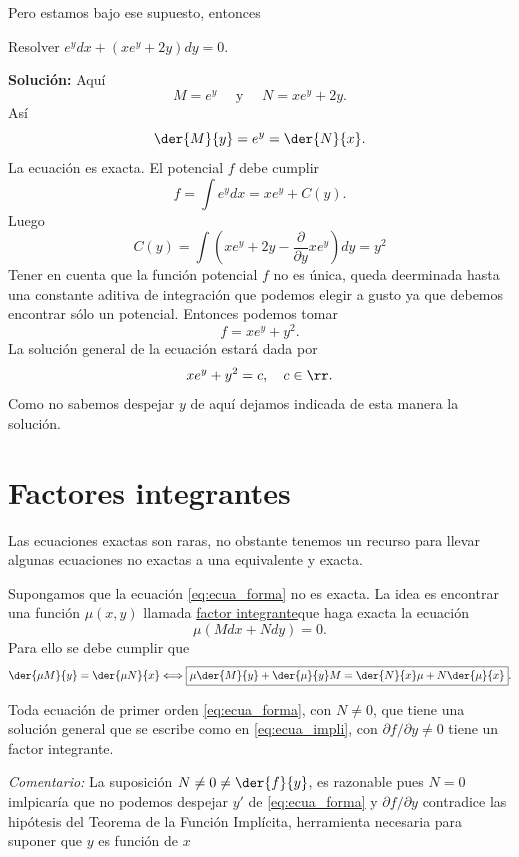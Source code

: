  Pero estamos bajo ese supuesto, entonces

\begin{ejemplo} Resolver $e^ydx+(xe^y+2y)dy=0$.
 \end{ejemplo}


\noindent\textbf{Solución:} Aquí
\[M=e^y\quad\text{ y }\quad N=xe^y+2y.\]
Así
\[\der{M}{y}=e^y=\der{N}{x}.\]
La ecuación es exacta. El potencial $f$ debe cumplir
\[f=\int e^ydx=xe^y+C(y).\]
Luego
\[C(y)=\int\left( xe^y+2y -\frac{\partial}{\partial y} xe^y\right)dy= y^2\]
Tener en cuenta que la función potencial $f$ no es única, queda deerminada hasta una constante aditiva de integración que podemos elegir a gusto ya que
debemos encontrar sólo un potencial. Entonces podemos tomar
\[f= xe^y+y^2.\]
La solución general de la ecuación estará dada por
\[xe^y+y^2=c,\quad c\in\rr.\]
Como no sabemos despejar $\boxed{y}$ de aquí dejamos indicada de esta manera la solución.



\section{Factores integrantes}

 Las ecuaciones exactas son raras, no obstante tenemos un recurso para llevar algunas ecuaciones no exactas a una equivalente y exacta.

 Supongamos que la ecuación  \eqref{eq:ecua_forma} no es  exacta. La idea es encontrar una función $\mu(x,y)$ llamada
\href{http://es.wikipedia.org/wiki/Ecuación_diferencial_exacta\#Factor_integrante.}{factor integrante}\link que haga exacta la ecuación
\[\mu\left(Mdx+Ndy\right)=0.\]
 Para ello se debe cumplir que
\begin{equation}\label{carac_factor}
  \der{\mu M}{y}=\der{\mu N}{x}\Longleftrightarrow \boxed{ \mu\der{M}{y}+\der{\mu}{y}M=\der{N}{x}\mu+N\der{\mu}{x}}.
\end{equation}

\begin{proposicion} Toda ecuación de primer
 orden \eqref{eq:ecua_forma}, con $N\neq 0$,  que tiene una solución general
que se escribe como en \eqref{eq:ecua_impli}, con $\partial f/\partial y\neq 0
$  tiene un factor integrante.
\end{proposicion}
\noindent\textit{Comentario:} La suposición $N\neq 0 \neq\der{f}{y}$,  es razonable pues $N=0$ imlpicaría que no podemos despejar $y'$ de \eqref{eq:ecua_forma}  y $\partial f/\partial y$ contradice las hipótesis del Teorema de la Función Implícita, herramienta necesaria para suponer que $y$ es función de $x$


